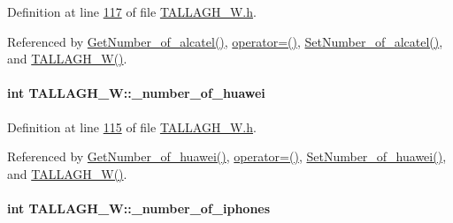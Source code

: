 Definition at line \hyperlink{_t_a_l_l_a_g_h___w_8h_source_l00117}{117} of file \hyperlink{_t_a_l_l_a_g_h___w_8h_source}{T\+A\+L\+L\+A\+G\+H\+\_\+\+W.\+h}.



Referenced by \hyperlink{_t_a_l_l_a_g_h___w_8cpp_source_l00071}{Get\+Number\+\_\+of\+\_\+alcatel()}, \hyperlink{_t_a_l_l_a_g_h___w_8h_source_l00075}{operator=()}, \hyperlink{_t_a_l_l_a_g_h___w_8cpp_source_l00067}{Set\+Number\+\_\+of\+\_\+alcatel()}, and \hyperlink{_t_a_l_l_a_g_h___w_8h_source_l00024}{T\+A\+L\+L\+A\+G\+H\+\_\+\+W()}.

\paragraph[{\texorpdfstring{\+\_\+number\+\_\+of\+\_\+huawei}{_number_of_huawei}}]{\setlength{\rightskip}{0pt plus 5cm}int T\+A\+L\+L\+A\+G\+H\+\_\+\+W\+::\+\_\+number\+\_\+of\+\_\+huawei\hspace{0.3cm}{\ttfamily [private]}}\hypertarget{class_t_a_l_l_a_g_h___w_ab966ff243f14eefc346e0b031f21c9b6_ab966ff243f14eefc346e0b031f21c9b6}{}\label{class_t_a_l_l_a_g_h___w_ab966ff243f14eefc346e0b031f21c9b6_ab966ff243f14eefc346e0b031f21c9b6}


Definition at line \hyperlink{_t_a_l_l_a_g_h___w_8h_source_l00115}{115} of file \hyperlink{_t_a_l_l_a_g_h___w_8h_source}{T\+A\+L\+L\+A\+G\+H\+\_\+\+W.\+h}.



Referenced by \hyperlink{_t_a_l_l_a_g_h___w_8cpp_source_l00087}{Get\+Number\+\_\+of\+\_\+huawei()}, \hyperlink{_t_a_l_l_a_g_h___w_8h_source_l00075}{operator=()}, \hyperlink{_t_a_l_l_a_g_h___w_8cpp_source_l00083}{Set\+Number\+\_\+of\+\_\+huawei()}, and \hyperlink{_t_a_l_l_a_g_h___w_8h_source_l00024}{T\+A\+L\+L\+A\+G\+H\+\_\+\+W()}.

\paragraph[{\texorpdfstring{\+\_\+number\+\_\+of\+\_\+iphones}{_number_of_iphones}}]{\setlength{\rightskip}{0pt plus 5cm}int T\+A\+L\+L\+A\+G\+H\+\_\+\+W\+::\+\_\+number\+\_\+of\+\_\+iphones\hspace{0.3cm}{\ttfamily [private]}}\hypertarget{class_t_a_l_l_a_g_h___w_ad8a7847f895cd13b45331e4f3cd20c2e_ad8a7847f895cd13b45331e4f3cd20c2e}{}\label{class_t_a_l_l_a_g_h___w_ad8a7847f895cd13b45331e4f3cd20c2e_ad8a7847f895cd13b45331e4f3cd20c2e}


